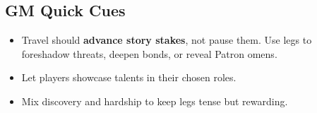 \subsection{GM Quick Cues}
\begin{itemize}
  \item Travel should \textbf{advance story stakes}, not pause them. Use legs to foreshadow threats, deepen bonds, or reveal Patron omens.
  \item Let players showcase talents in their chosen roles.
  \item Mix discovery and hardship to keep legs tense but rewarding.
\end{itemize}